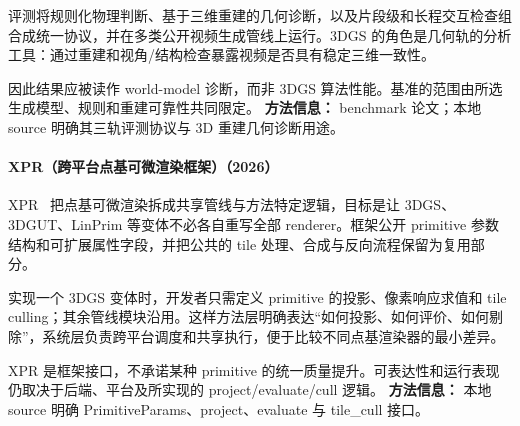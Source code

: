 评测将规则化物理判断、基于三维重建的几何诊断，以及片段级和长程交互检查组合成统一协议，并在多类公开视频生成管线上运行。3DGS 的角色是几何轨的分析工具：通过重建和视角/结构检查暴露视频是否具有稳定三维一致性。

因此结果应被读作 world-model 诊断，而非 3DGS 算法性能。基准的范围由所选生成模型、规则和重建可靠性共同限定。
\textbf{方法信息：} benchmark 论文；本地 source 明确其三轨评测协议与 3D 重建几何诊断用途。
\paragraph{XPR（跨平台点基可微渲染框架）（2026）}
XPR~\cite{2606_11529} 把点基可微渲染拆成共享管线与方法特定逻辑，目标是让 3DGS、3DGUT、LinPrim 等变体不必各自重写全部 renderer。框架公开 primitive 参数结构和可扩展属性字段，并把公共的 tile 处理、合成与反向流程保留为复用部分。

实现一个 3DGS 变体时，开发者只需定义 primitive 的投影、像素响应求值和 tile culling；其余管线模块沿用。这样方法层明确表达“如何投影、如何评价、如何剔除”，系统层负责跨平台调度和共享执行，便于比较不同点基渲染器的最小差异。

XPR 是框架接口，不承诺某种 primitive 的统一质量提升。可表达性和运行表现仍取决于后端、平台及所实现的 project/evaluate/cull 逻辑。
\textbf{方法信息：} 本地 source 明确 PrimitiveParams、project、evaluate 与 tile\_cull 接口。
